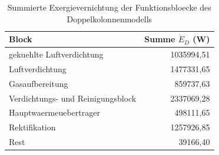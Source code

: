 \begin{longtable}{lr}
\caption{Summierte Exergievernichtung der Funktionsbloecke des Doppelkolonnenmodells} \\
\hline
Block & Summe $\dot{E}_D$ (W) \\
\hline
gekuehlte Luftverdichtung & 1035994,51 \\
Luftverdichtung & 1477331,65 \\
Gasaufbereitung & 859737,63 \\
Verdichtungs- und Reinigungsblock & 2337069,28 \\
Hauptwaermeuebertrager & 498111,65 \\
Rektifikation & 1257926,85 \\
Rest & 39166,40 \\
\hline
\end{longtable}

